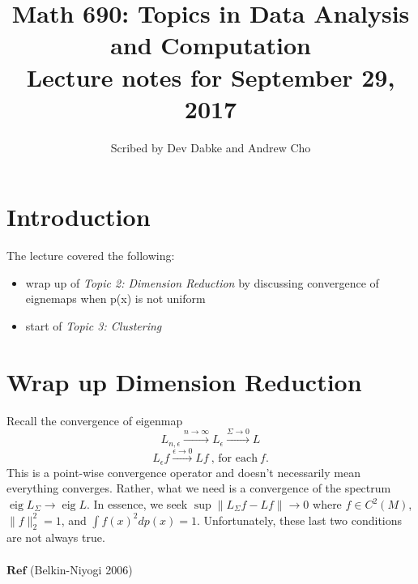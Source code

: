 \documentclass[12pt]{article}
\title{Math 690: Topics in Data Analysis and Computation \\
Lecture notes for September 29, 2017}
\date{}
\author{Scribed by Dev Dabke and Andrew Cho}
\theoremstyle{plain}
\DeclareMathOperator*{\eig}{eig}
\begin{document}
\maketitle

\section{Introduction}
The lecture covered the following:
\begin{itemize}
	\item wrap up of \textit{Topic 2: Dimension Reduction} by discussing convergence of eignemaps when p(x) is not uniform
	\item start of \textit{Topic 3: Clustering}
\end{itemize}

\section{Wrap up Dimension Reduction}
Recall the convergence of eigenmap
\[
L_{n, \epsilon} \xrightarrow{n\to\infty} L_{\epsilon} \xrightarrow{\Sigma \to 0} L
\]
\[
L_{\epsilon} f \xrightarrow{\epsilon \to 0} Lf ~\text{, for each}~ f. 
\]
This is a point-wise convergence operator and doesn't necessarily mean everything converges. Rather, what we need is a convergence of the spectrum $ \eig{L_{\Sigma}} \to \eig{L} $. In essence, we seek $\sup { \| L_{\Sigma} f - L f \| } \to 0$ where $ f \in C^2 (M) $, $ \| f \|_2^2 = 1 $, and $\int{f(x)^2dp(x)=1}$. Unfortunately, these last two conditions are not always true. 
\\ \\
$\textbf{Ref}$ (Belkin-Niyogi 2006)
\end{document}
